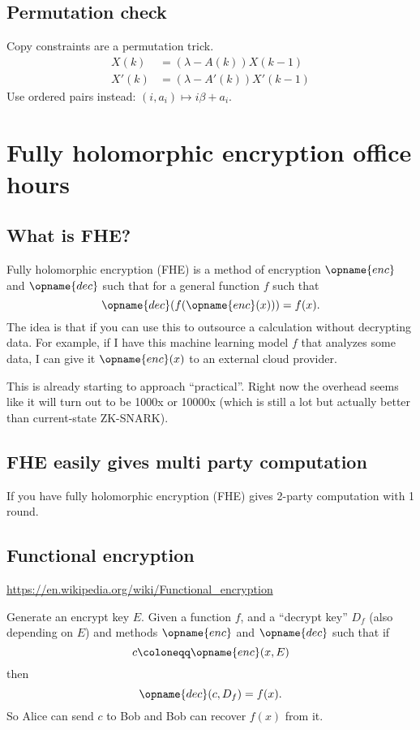 \documentclass[11pt]{scrreprt}
\begin{document}
\section{Permutation check}
Copy constraints are a permutation trick.
\begin{align*}
  X(k) &= (\lambda - A(k)) X(k-1) \\
  X'(k) &= (\lambda - A'(k)) X'(k-1)
\end{align*}
Use ordered pairs instead: $(i,a_i) \mapsto i \beta + a_i$.

\chapter{Fully holomorphic encryption office hours}
\section{What is FHE?}
Fully holomorphic encryption (FHE) is a method of encryption
$\opname{enc}$ and $\opname{dec}$ such that for a general function $f$ such that
\[ \opname{dec}(f(\opname{enc}(x))) = f(x). \]
The idea is that if you can use this to outsource a calculation without decrypting data.
For example, if I have this machine learning model $f$ that analyzes some data,
I can give it $\opname{enc}(x)$ to an external cloud provider.

This is already starting to approach ``practical''.
Right now the overhead seems like it will turn out to be 1000x or 10000x
(which is still a lot but actually better than current-state ZK-SNARK).

\section{FHE easily gives multi party computation}
If you have fully holomorphic encryption (FHE) gives 2-party computation with 1 round.

\section{Functional encryption}
\url{https://en.wikipedia.org/wiki/Functional_encryption}

Generate an encrypt key $E$.
Given a function $f$, and a ``decrypt key'' $D_f$ (also depending on $E$)
and methods $\opname{enc}$ and $\opname{dec}$ such that if
\[ c \coloneqq \opname{enc}(x, E) \]
then
\[ \opname{dec}(c, D_f) = f(x). \]
So Alice can send $c$ to Bob and Bob can recover $f(x)$ from it.
\end{document}
